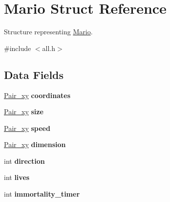 \hypertarget{struct_mario}{}\section{Mario Struct Reference}
\label{struct_mario}


Structure representing \mbox{\hyperlink{struct_mario}{Mario}}.  




{\ttfamily \#include $<$all.\+h$>$}

\subsection*{Data Fields}
\begin{DoxyCompactItemize}
\item 
\mbox{\label{struct_mario_acbd20e80221da3c5a7cf991c995c7762}} 
\mbox{\hyperlink{all_8h_a9a35f73dcc6cf9a466e6542847bd8882}{Pair\+\_\+xy}} {\bfseries coordinates}
\item 
\mbox{\label{struct_mario_a3d66e375fa4b31f1edf8eb0fc3a73812}} 
\mbox{\hyperlink{all_8h_a9a35f73dcc6cf9a466e6542847bd8882}{Pair\+\_\+xy}} {\bfseries size}
\item 
\mbox{\label{struct_mario_a17e25b2ef4c597ac58da845ec3bce5c6}} 
\mbox{\hyperlink{all_8h_a9a35f73dcc6cf9a466e6542847bd8882}{Pair\+\_\+xy}} {\bfseries speed}
\item 
\mbox{\label{struct_mario_a0da7d680eb31a67eac3371518ae0a6cb}} 
\mbox{\hyperlink{all_8h_a9a35f73dcc6cf9a466e6542847bd8882}{Pair\+\_\+xy}} {\bfseries dimension}
\item 
\mbox{\label{struct_mario_a886d551d5381dc3e53f17825ffc51641}} 
int {\bfseries direction}
\item 
\mbox{\label{struct_mario_ac1d68ef9a5dd304c5015e07af7f2bb19}} 
int {\bfseries lives}
\item 
\mbox{\label{struct_mario_aa060abc8eacd9397609e1da737ebc9aa}} 
int {\bfseries immortality\+\_\+timer}
\item 
\mbox{\label{struct_mario_a79408016a8356227618acff03385cb03}} 

\end{DoxyCompactItemize}
